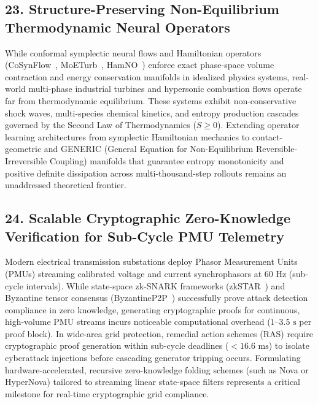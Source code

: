 \subsection{23. Structure-Preserving Non-Equilibrium Thermodynamic Neural Operators}
While conformal symplectic neural flows and Hamiltonian operators (CoSynFlow~\cite{Xu2026CoSynFlow}, MoETurb~\cite{Pan2026MoETurb}, HamNO~\cite{Obieke2026HamNO}) enforce exact phase-space volume contraction and energy conservation manifolds in idealized physics systems, real-world multi-phase industrial turbines and hypersonic combustion flows operate far from thermodynamic equilibrium. These systems exhibit non-conservative shock waves, multi-species chemical kinetics, and entropy production cascades governed by the Second Law of Thermodynamics ($\dot{S} \ge 0$). Extending operator learning architectures from symplectic Hamiltonian mechanics to contact-geometric and GENERIC (General Equation for Non-Equilibrium Reversible-Irreversible Coupling) manifolds that guarantee entropy monotonicity and positive definite dissipation across multi-thousand-step rollouts remains an unaddressed theoretical frontier.

\subsection{24. Scalable Cryptographic Zero-Knowledge Verification for Sub-Cycle PMU Telemetry}
Modern electrical transmission substations deploy Phasor Measurement Units (PMUs) streaming calibrated voltage and current synchrophasors at $60\text{ Hz}$ (sub-cycle intervals). While state-space zk-SNARK frameworks (zkSTAR~\cite{Ramanan2025zkSTAR}) and Byzantine tensor consensus (ByzantineP2P~\cite{Liu2025ByzantineP2P}) successfully prove attack detection compliance in zero knowledge, generating cryptographic proofs for continuous, high-volume PMU streams incurs noticeable computational overhead ($1$--$3.5\text{ s}$ per proof block). In wide-area grid protection, remedial action schemes (RAS) require cryptographic proof generation within sub-cycle deadlines ($<16.6\text{ ms}$) to isolate cyberattack injections before cascading generator tripping occurs. Formulating hardware-accelerated, recursive zero-knowledge folding schemes (such as Nova or HyperNova) tailored to streaming linear state-space filters represents a critical milestone for real-time cryptographic grid compliance.

